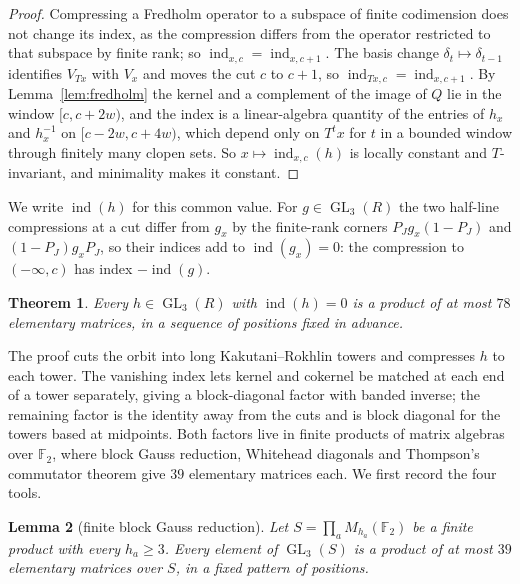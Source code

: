 \documentclass[11pt]{amsart}
\newtheorem{theorem}{Theorem}[section]
\newtheorem{lemma}[theorem]{Lemma}
\theoremstyle{remark}
\newcommand{\F}{\mathbb F}
\newcommand{\GL}{\operatorname{GL}}
\newcommand{\ind}{\operatorname{ind}}
\begin{document}
\begin{proof}
Compressing a Fredholm operator to a subspace of finite codimension does
not change its index, as the compression differs from the operator
restricted to that subspace by finite rank; so $\ind_{x,c}=\ind_{x,c+1}$.
The basis change $\delta_t\mapsto\delta_{t-1}$ identifies $V_{Tx}$ with
$V_x$ and moves the cut $c$ to $c+1$, so $\ind_{Tx,c}=\ind_{x,c+1}$. By
Lemma~\ref{lem:fredholm} the kernel and a complement of the image of $Q$
lie in the window $[c,c+2w)$, and the index is a linear-algebra quantity
of the entries of $h_x$ and $h_x^{-1}$ on $[c-2w,c+4w)$, which depend only
on $T^tx$ for $t$ in a bounded window through finitely many clopen sets.
So $x\mapsto\ind_{x,c}(h)$ is locally constant and $T$-invariant, and
minimality makes it constant.
\end{proof}

We write $\ind(h)$ for this common value. For $g\in\GL_3(R)$ the two
half-line compressions at a cut differ from $g_x$ by the finite-rank corners
$P_Jg_x(1-P_J)$ and $(1-P_J)g_xP_J$, so their indices add to
$\ind(g_x)=0$: the compression to $(-\infty,c)$ has index $-\ind(g)$.

\begin{theorem}\label{thm:bounded}
Every $h\in\GL_3(R)$ with $\ind(h)=0$ is a product of at most $78$
elementary matrices, in a sequence of positions fixed in advance.
\end{theorem}

The proof cuts the orbit into long Kakutani--Rokhlin towers and compresses
$h$ to each tower. The vanishing index lets kernel and cokernel be matched
at each end of a tower separately, giving a block-diagonal factor with
banded inverse; the remaining factor is the identity away from the cuts and
is block diagonal for the towers based at midpoints. Both factors live in
finite products of matrix algebras over $\F_2$, where block Gauss
reduction, Whitehead diagonals and Thompson's commutator theorem give $39$
elementary matrices each. We first record the four tools.

\begin{lemma}[finite block Gauss reduction]\label{lem:T1}
Let $S=\prod_aM_{h_a}(\F_2)$ be a finite product with every $h_a\ge3$.
Every element of $\GL_3(S)$ is a product of at most $39$ elementary
matrices over $S$, in a fixed pattern of positions.
\end{lemma}
\end{document}
